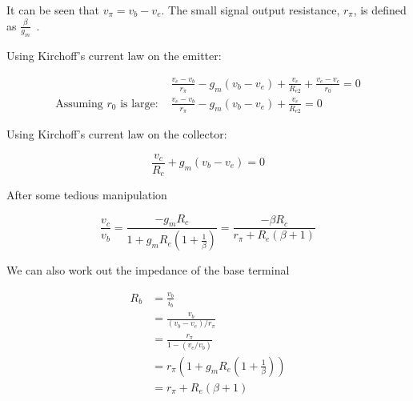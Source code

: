 \documentclass[a4paper,11pt]{article}
\begin{document}
            It can be seen that $v_\pi = v_b - v_e$. The small signal output resistance, $r_\pi$, is defined as $\frac{\beta}{g_m}$~\cite[p. 29]{ADAIC}.

            Using Kirchoff's current law on the emitter:

            \begin{subequations}
            \begin{align}
                &\frac{v_e - v_b}{r_\pi} - g_m (v_b - v_e) + \frac{v_e}{R_{e2}} + \frac{v_e - v_c}{r_0} = 0\\
                \textrm{Assuming $r_0$ is large: } &\frac{v_e - v_b}{r_\pi} - g_m (v_b - v_e) + \frac{v_e}{R_{e2}} = 0 \label{eq:kclEmitter}
            \end{align}
            \end{subequations}

            Using Kirchoff's current law on the collector:

            \begin{equation} \label{eq:kclCollector}
                \frac{v_c}{R_c} + g_m(v_b - v_e) = 0
            \end{equation}

            After some tedious manipulation
            
            \begin{equation} \label{eq:s1gain}
                \frac{v_c}{v_b} = \frac{-g_m R_c}{1 + g_m R_e \left( 1+ \frac{1}{\beta} \right) }
                                = \frac{-\beta R_c}{r_{\pi} + R_e (\beta + 1)}
            \end{equation}
                
            We can also work out the impedance of the base terminal
            
            \begin{subequations}
            \begin{align}
                R_b &= \frac{v_b}{i_b}\\
                    &= \frac{v_b}{(v_b - v_e) / r_{\pi}}\\
                    &= \frac{r_{\pi}}{1 - (v_e / v_b)}\\
                    &= r_{\pi} \left( 1 + g_m R_e \left( 1 + \frac{1}{\beta} \right) \right)\\
                    &= r_{\pi} + R_e (\beta + 1)
            \end{align}
            \end{subequations}
            
\end{document}
